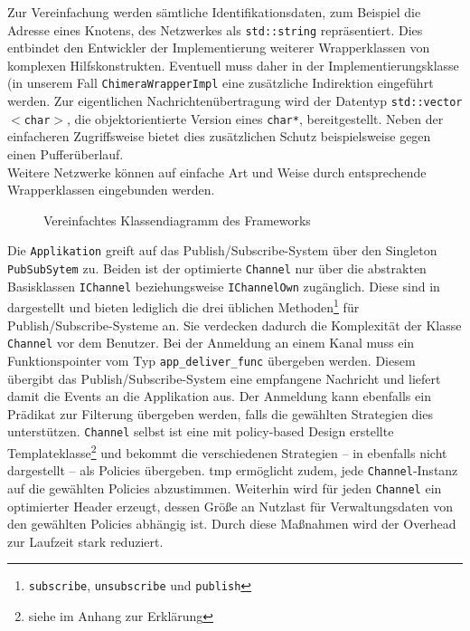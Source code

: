 Zur Vereinfachung werden sämtliche Identifikationsdaten, zum Beispiel die Adresse eines Knotens, des Netzwerkes als \texttt{std::string} repräsentiert. Dies entbindet den Entwickler der Implementierung weiterer Wrapperklassen von komplexen Hilfskonstrukten. Eventuell muss daher in der Implementierungsklasse (in unserem Fall \texttt{ChimeraWrapperImpl} eine zusätzliche Indirektion eingeführt werden. Zur eigentlichen Nachrichtenübertragung wird der Datentyp \texttt{std::vector$<$char$>$}, die objektorientierte Version eines \texttt{char*}, bereitgestellt. Neben der einfacheren Zugriffsweise bietet dies zusätzlichen Schutz beispielsweise gegen einen Pufferüberlauf.\\
Weitere Netzwerke können auf einfache Art und Weise durch entsprechende Wrapperklassen eingebunden werden.

\begin{figure}[htbp]
\centering
{}
\caption{Vereinfachtes Klassendiagramm des Frameworks}
\label{fig:uml}
\end{figure}

Die \texttt{Applikation} greift auf das Publish/Subscribe-System über den Singleton \texttt{PubSub\-Sytem} zu. Beiden ist der optimierte \texttt{Channel} nur über die abstrakten Basisklassen \texttt{IChannel} beziehungsweise \texttt{IChannelOwn} zugänglich. Diese sind in  dargestellt und bieten lediglich die drei üblichen Methoden\footnote{\texttt{subscribe}, \texttt{unsubscribe} und \texttt{publish}} für Publish/Subscribe-Systeme an. Sie verdecken dadurch die Komplexität der Klasse \texttt{Channel} vor dem Benutzer. Bei der Anmeldung an einem Kanal muss ein Funktionspointer vom Typ \texttt{app\_deliver\_func} übergeben werden. Diesem übergibt das Publish/Subscribe-System eine empfangene Nachricht und liefert damit die Events an die Applikation aus. Der Anmeldung kann ebenfalls ein Prädikat zur Filterung übergeben werden, falls die gewählten Strategien dies unterstützen. \texttt{Channel} selbst ist eine mit policy-based Design erstellte Templateklasse\footnote{siehe  im Anhang zur Erklärung} und bekommt die verschiedenen Strategien -- in  ebenfalls nicht dargestellt -- als Policies übergeben. \ac{tmp} ermöglicht zudem, jede \texttt{Channel}-Instanz auf die gewählten Policies abzustimmen. Weiterhin wird für jeden \texttt{Channel} ein optimierter Header erzeugt, dessen Größe an Nutzlast für Verwaltungsdaten von den gewählten Policies abhängig ist. Durch diese Maßnahmen wird der Overhead zur Laufzeit stark reduziert. 

